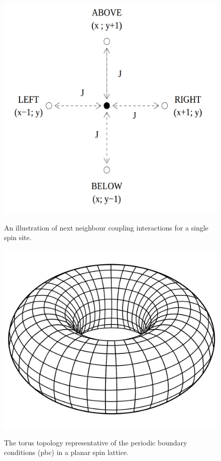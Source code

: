 \documentclass[a4paper]{article}
\begin{document}
\begin{figure}[h]
\centering
\begin{minipage}[b]{0.3\linewidth}
\includegraphics[width=1\textwidth]{neighbour.png}
\label{fig:minipage1}
\caption{An illustration of next neighbour coupling interactions for a single spin site.}
\end{minipage}
\hspace{1.85cm}
\quad
\begin{minipage}[b]{0.4\linewidth}
\includegraphics[width=1\textwidth]{torus.png}
\label{fig:minipage2}
\caption{The torus topology representative of the periodic boundary conditions (pbc) in a planar spin lattice.}
\end{minipage}
\end{figure}
\end{document}
